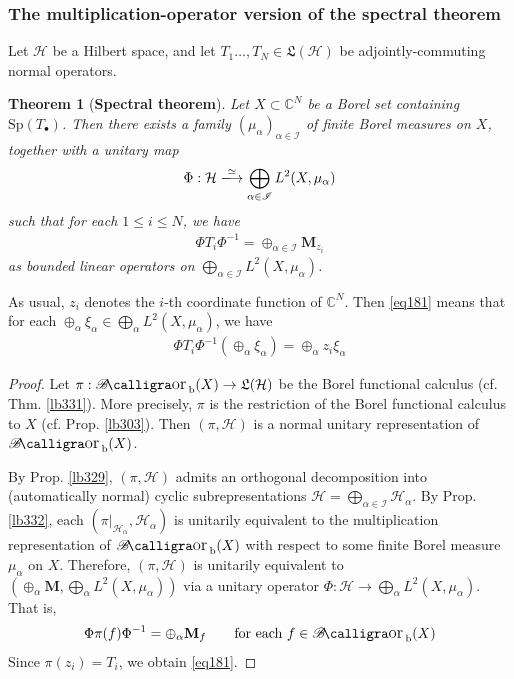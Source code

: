 \documentclass[12pt,b5paper,notitlepage]{article}
\theoremstyle{definition}
\theoremstyle{plain}
\newtheorem{thm}[df]{Theorem}
\DeclareMathOperator{\Borb}{{\mathscr{B}\text{\kern -2pt {\calligra\large or}}\,}_{\mathrm b}}
\newcommand{\fk}{\mathfrak}
\newcommand{\blt}{\bullet}
\newcommand{\Cbb}{\mathbb C}
\newcommand{\Sp}{\mathrm{Sp}}
\newcommand{\MH}{\mathcal H}
\newcommand{\SI}{\mathscr I}
\newcommand{\Mbf}{\mathbf M}
\numberwithin{equation}{section}
\begin{document}
\subsubsection{The multiplication-operator version of the spectral theorem}

Let $\MH$ be a Hilbert space, and let $T_1\dots,T_N\in\fk L(\MH)$ be adjointly-commuting normal operators.


\begin{thm}[\textbf{Spectral theorem}]\label{lb330}
Let $X\subset\Cbb^N$ be a Borel set containing $\Sp(T_\blt)$. Then there exists a family $(\mu_\alpha)_{\alpha\in \SI}$ of finite Borel measures on $X$, together with a unitary map
\begin{gather*}
\Phi: \MH\xlongrightarrow{\simeq}\bigoplus_{\alpha\in\SI} L^2(X,\mu_\alpha)
\end{gather*}
such that for each $1\leq i\leq N$, we have
\begin{align}\label{eq181}
\Phi T_i\Phi^{-1}=\oplus_{\alpha\in\SI}\Mbf_{z_i}
\end{align}
as bounded linear operators on $\bigoplus_{\alpha\in\SI} L^2(X,\mu_\alpha)$.
\end{thm}

As usual, $z_i$ denotes the $i$-th coordinate function of $\Cbb^N$. Then \eqref{eq181} means that for each $\oplus_\alpha\xi_\alpha\in\bigoplus_\alpha L^2(X,\mu_\alpha)$, we have
\begin{align*}
\Phi T_i\Phi^{-1}(\oplus_\alpha\xi_\alpha)=\oplus_\alpha z_i\xi_\alpha
\end{align*}


\begin{proof}
Let $\pi:\Borb(X)\rightarrow\fk L(\MH)$ be the Borel functional calculus (cf. Thm. \ref{lb331}). More precisely, $\pi$ is the restriction of the Borel functional calculus to $X$ (cf. Prop. \ref{lb303}). Then $(\pi,\MH)$ is a normal unitary representation of $\Borb(X)$. 

By Prop. \ref{lb329}, $(\pi,\MH)$ admits an orthogonal decomposition into (automatically normal) cyclic subrepresentations $\MH=\bigoplus_{\alpha\in\SI}\MH_\alpha$. By Prop. \ref{lb332}, each $(\pi|_{\MH_\alpha},\MH_\alpha)$ is unitarily equivalent to the multiplication representation of $\Borb(X)$ with respect to some finite Borel measure $\mu_\alpha$ on $X$. Therefore, $(\pi,\MH)$ is unitarily equivalent to $(\oplus_\alpha \Mbf,\bigoplus_\alpha L^2(X,\mu_\alpha))$ via a unitary operator $\Phi:\MH\rightarrow \bigoplus_\alpha L^2(X,\mu_\alpha)$. That is,
\begin{align*}
\Phi\pi(f)\Phi^{-1}=\oplus_\alpha \Mbf_f\qquad\text{for each }f\in\Borb(X)
\end{align*}
Since $\pi(z_i)=T_i$, we obtain \eqref{eq181}.
\end{proof}
\end{document}
